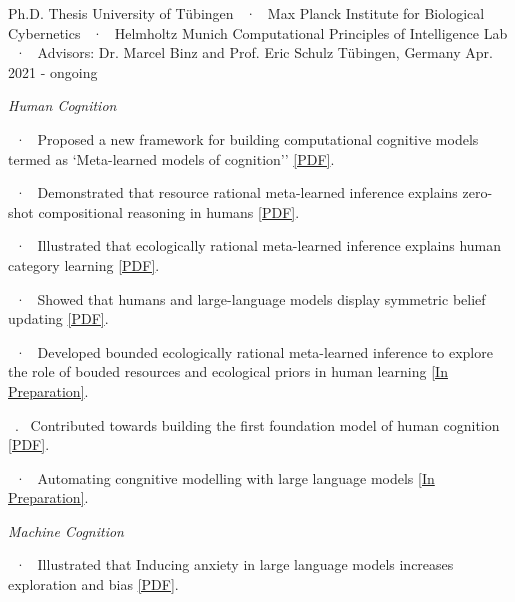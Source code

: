 \begin{cventries}
\vspace{2mm}

    \cventryLab
    {Ph.D. Thesis}
    {University of Tübingen ~·~ Max Planck Institute for Biological Cybernetics  ~·~ Helmholtz Munich} %
    {Computational Principles of Intelligence Lab ~·~ Advisors: Dr. Marcel Binz and Prof. Eric Schulz}%
    {Tübingen, Germany} %
    {Apr. 2021 - ongoing}
    {%
    \begin{cvitems}
    \item \textit{Human Cognition}
     \item ~·~  Proposed a new framework for building computational cognitive models termed as `Meta-learned models of cognition'' \href{https://arxiv.org/abs/2304.06729}{[PDF]}.
     \item ~·~  Demonstrated that resource rational meta-learned inference explains zero-shot compositional reasoning in humans \href{https://osf.io/preprints/psyarxiv/ymve5}{[PDF]}.
      \item ~·~ Illustrated that ecologically rational meta-learned inference explains human category learning \href{https://arxiv.org/abs/2402.01821}{[PDF]}.
      \item ~·~ Showed that humans and large-language models display symmetric belief updating \href{https://arxiv.org/pdf/2402.01821.pdf}{[PDF]}.
      \item ~·~ Developed bounded ecologically rational meta-learned inference to explore the role of bouded resources and ecological priors in human learning \href{}{[In Preparation]}.
      \item ~.~ Contributed towards building the first foundation model of human cognition \href{https://akjagadish.github.io/assets/Centaur_3_1__a_foundation_model_of_human_cognition.pdf}{[PDF]}.
      \item ~·~ Automating congnitive modelling with large language models \href{}{[In Preparation]}.
      \item \hfill 
      \item \textit{Machine Cognition}
      \item ~·~ Illustrated that Inducing anxiety in large language models increases exploration and bias \href{https://arxiv.org/abs/2304.11111}{[PDF]}.

\end{cvitems}}
\end{cventries}
